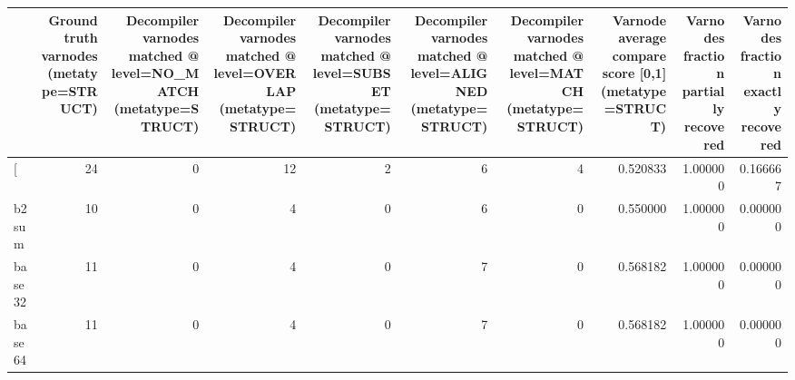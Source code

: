 \begin{tabular}{lrrrrrrrrr}
\toprule
{} &  Ground truth varnodes (metatype=STRUCT) &  Decompiler varnodes matched @ level=NO\_MATCH (metatype=STRUCT) &  Decompiler varnodes matched @ level=OVERLAP (metatype=STRUCT) &  Decompiler varnodes matched @ level=SUBSET (metatype=STRUCT) &  Decompiler varnodes matched @ level=ALIGNED (metatype=STRUCT) &  Decompiler varnodes matched @ level=MATCH (metatype=STRUCT) &  Varnode average compare score [0,1] (metatype=STRUCT) &  Varnodes fraction partially recovered &  Varnodes fraction exactly recovered \\
\midrule
[         &                                       24 &                                                  0 &                                                 12 &                                                  2 &                                                  6 &                                                  4 &                                           0.520833 &                               1.000000 &                             0.166667 \\
b2sum     &                                       10 &                                                  0 &                                                  4 &                                                  0 &                                                  6 &                                                  0 &                                           0.550000 &                               1.000000 &                             0.000000 \\
base32    &                                       11 &                                                  0 &                                                  4 &                                                  0 &                                                  7 &                                                  0 &                                           0.568182 &                               1.000000 &                             0.000000 \\
base64    &                                       11 &                                                  0 &                                                  4 &                                                  0 &                                                  7 &                                                  0 &                                           0.568182 &                               1.000000 &                             0.000000 \\

\end{tabular}

